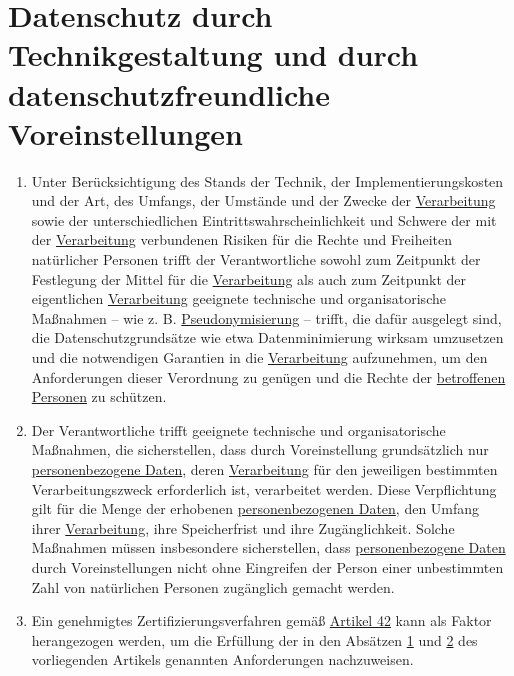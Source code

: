 \chapter{Datenschutz durch Technikgestaltung und durch datenschutzfreundliche Voreinstellungen}
\label{ch:25}


\begin{enumerate}

  \item Unter Berücksichtigung des Stands der Technik, der Implementierungskosten und der Art, des Umfangs, der Umstände
   und der Zwecke der \hyperref[itm:04-2]{Verarbeitung} sowie der unterschiedlichen Eintrittswahrscheinlichkeit und Schwere der mit der
   \hyperref[itm:04-2]{Verarbeitung} verbundenen Risiken für die Rechte und Freiheiten natürlicher Personen trifft der Verantwortliche
   sowohl zum Zeitpunkt der Festlegung der Mittel für die \hyperref[itm:04-2]{Verarbeitung} als auch zum Zeitpunkt der eigentlichen
   \hyperref[itm:04-2]{Verarbeitung} geeignete technische und organisatorische Maßnahmen -- wie z. B. \hyperref[itm:04-5]{Pseudonymisierung} -- trifft, die dafür
   ausgelegt sind, die Datenschutzgrundsätze wie etwa Datenminimierung wirksam umzusetzen und die notwendigen Garantien
   in die \hyperref[itm:04-2]{Verarbeitung} aufzunehmen, um den Anforderungen dieser Verordnung zu genügen und die Rechte der \hyperref[itm:04-1]{betroffenen
   Personen} zu schützen.
  \label{itm:25-1}

  \item Der Verantwortliche trifft geeignete technische und organisatorische Maßnahmen, die sicherstellen, dass durch
   Voreinstellung grundsätzlich nur \hyperref[itm:04-1]{personenbezogene Daten}, deren \hyperref[itm:04-2]{Verarbeitung} für den jeweiligen bestimmten
   Verarbeitungszweck erforderlich ist, verarbeitet werden. Diese Verpflichtung gilt für die Menge der erhobenen
   \hyperref[itm:04-1]{personenbezogenen Daten}, den Umfang ihrer \hyperref[itm:04-2]{Verarbeitung}, ihre Speicherfrist und ihre Zugänglichkeit. Solche Maßnahmen
   müssen insbesondere sicherstellen, dass \hyperref[itm:04-1]{personenbezogene Daten} durch Voreinstellungen nicht ohne Eingreifen der
   Person einer unbestimmten Zahl von natürlichen Personen zugänglich gemacht werden.
  \label{itm:25-2}

  \item Ein genehmigtes Zertifizierungsverfahren gemäß \hyperref[ch:42]{Artikel 42} kann als Faktor herangezogen werden,
   um die Erfüllung der in den Absätzen \hyperref[itm:25-1]{1} und \hyperref[itm:25-2]{2} des vorliegenden Artikels
   genannten Anforderungen nachzuweisen.
  \label{itm:25-3}

\end{enumerate}


